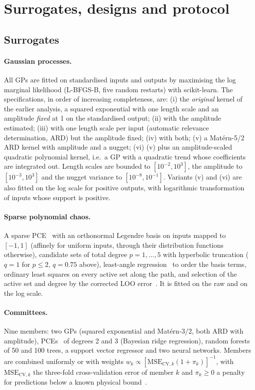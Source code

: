 \section{Surrogates, designs and protocol}
\label{sec:protocol}
\subsection{Surrogates}
\paragraph{Gaussian processes.} All GPs are fitted on standardised inputs
and outputs by maximising the log marginal likelihood (L-BFGS-B, five
random restarts) with scikit-learn. The specifications, in order of
increasing completeness, are: (i) the \emph{original} kernel of the earlier
analysis, a squared exponential with one length scale and an amplitude
\emph{fixed} at 1 on the standardised output; (ii) with the amplitude
estimated; (iii) with one length scale per input (automatic relevance
determination, ARD) but the amplitude fixed; (iv) with both; (v) a
Mat\'ern-5/2 ARD kernel with amplitude and a nugget; (vi) (v) plus an
amplitude-scaled quadratic polynomial kernel, i.e.\ a GP with a quadratic
trend whose coefficients are integrated out. Length scales are bounded to
$[10^{-2},10^3]$, the amplitude to $[10^{-3},10^3]$ and the nugget variance
to $[10^{-8},10^{-1}]$. Variants (v) and (vi) are also fitted on the log
scale for positive outputs, with logarithmic transformation of inputs whose
support is positive.

\paragraph{Sparse polynomial chaos.} A sparse PCE~\cite{blatman2011} with an
orthonormal Legendre basis on inputs mapped to $[-1,1]$ (affinely for
uniform inputs, through their distribution functions otherwise), candidate
sets of total degree $p=1,\dots,5$ with hyperbolic truncation ($q=1$ for
$p\le2$, $q=0.75$ above), least-angle regression~\cite{efron2004} to order
the basis terms, ordinary least squares on every active set along the path,
and selection of the active set and degree by the corrected LOO
error~\cite{blatman2011}. It is fitted on the raw and on the log scale.

\paragraph{Committees.} Nine members: two GPs (squared exponential and
Mat\'ern-3/2, both ARD with amplitude), PCEs~\cite{xiu2002,sudret2008} of degrees 2
and 3 (Bayesian ridge regression), random forests of 50 and 100 trees, a
support vector regressor and two neural networks. Members are combined
uniformly or with weights
$w_k\propto[\mathrm{MSE}_{\mathrm{CV},k}(1+\pi_k)]^{-1}$, with
$\mathrm{MSE}_{\mathrm{CV},k}$ the three-fold cross-validation error of
member $k$ and $\pi_k\ge0$ a penalty for predictions below a known
physical bound~\cite{goel2007,viana2009}.

